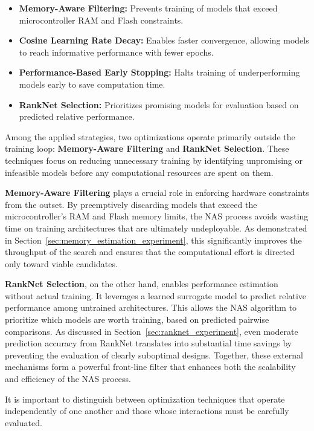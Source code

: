 \begin{itemize}
    \item \textbf{Memory-Aware Filtering:} Prevents training of models that exceed microcontroller RAM and Flash constraints.
    \item \textbf{Cosine Learning Rate Decay:} Enables faster convergence, allowing models to reach informative performance with fewer epochs.
    \item \textbf{Performance-Based Early Stopping:} Halts training of underperforming models early to save computation time.
    \item \textbf{RankNet Selection:} Prioritizes promising models for evaluation based on predicted relative performance.
\end{itemize}


Among the applied strategies, two optimizations operate primarily outside the training loop: \textbf{Memory-Aware Filtering} and \textbf{RankNet Selection}. These techniques focus on reducing unnecessary training by identifying unpromising or infeasible models before any computational resources are spent on them.

\textbf{Memory-Aware Filtering} plays a crucial role in enforcing hardware constraints from the outset. By preemptively discarding models that exceed the microcontroller's RAM and Flash memory limits, the NAS process avoids wasting time on training architectures that are ultimately undeployable. As demonstrated in Section~\ref{sec:memory_estimation_experiment}, this significantly improves the throughput of the search and ensures that the computational effort is directed only toward viable candidates.

\textbf{RankNet Selection}, on the other hand, enables performance estimation without actual training. It leverages a learned surrogate model to predict relative performance among untrained architectures. This allows the NAS algorithm to prioritize which models are worth training, based on predicted pairwise comparisons. As discussed in Section~\ref{sec:ranknet_experiment}, even moderate prediction accuracy from RankNet translates into substantial time savings by preventing the evaluation of clearly suboptimal designs. Together, these external mechanisms form a powerful front-line filter that enhances both the scalability and efficiency of the NAS process.

It is important to distinguish between optimization techniques that operate independently of one another and those whose interactions must be carefully evaluated. 

